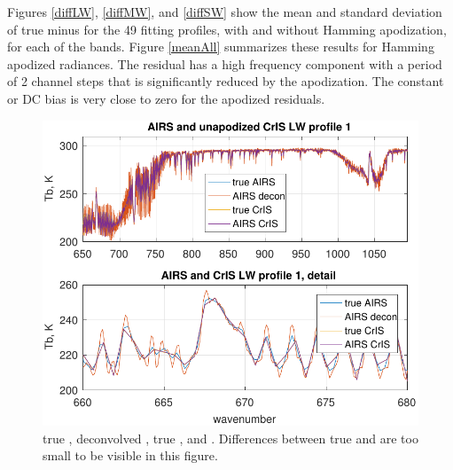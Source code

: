 \documentclass[10pt,twocolumn]{article}  %
\begin{document}
Figures \ref{diffLW}, \ref{diffMW}, and \ref{diffSW} show the mean
and standard deviation of true {\cris} minus {\airs} {\cris} for the
49 fitting profiles, with and without Hamming apodization, for each
of the {\cris} bands.  Figure \ref{meanAll} summarizes these results
for Hamming apodized radiances.  The residual has a high frequency
component with a period of 2 channel steps that is significantly
reduced by the apodization.  The constant or DC bias is very close
to zero for the apodized residuals.


\begin{figure} %
  \centering
  \includegraphics[width=\linewidth]{figures/a2cris_spec_LW.pdf}
  \caption{true {\airs}, deconvolved {\airs}, true {\cris}, and {\airs}
    {\cris}.  Differences between true {\cris} and {\airs} {\cris} are too
    small to be visible in this figure.}
  \label{specLW}
\end{figure}
\end{document}
